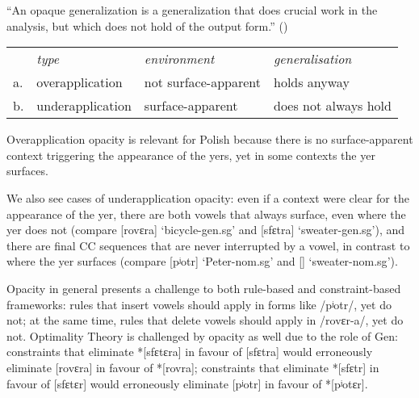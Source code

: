 \begin{example} \ee
\label{opacity}

``An opaque generalization is a generalization that does crucial work in the analysis, but which does not hold of the output form.''  (\citealt[338]{Idsardi:2000})

\begin{tabular}{llll}
	&{\it type}		&{\it environment}	&{\it generalisation}\\
a.	&overapplication&not surface-apparent	&holds anyway\\
b.	&underapplication&surface-apparent	&does not always hold\\ 
\end{tabular}
\end{example}


Overapplication opacity is relevant for Polish because there is no surface-ap\-par\-ent context triggering the appearance of the  yers, yet in some contexts the yer surfaces.

We also see cases of underapplication opacity: even if a context were clear for the appearance of the yer, there are both vowels that always surface, even where the yer does not (compare  [rovɛra] `bicycle-{\sc gen.sg}' and [sfɛtra] `sweater-{\sc gen.sg}'), and there are final CC sequences that are never interrupted by a vowel, in contrast to where the yer surfaces (compare [pʲotr] `Peter-{\sc nom.sg}' and  [] `sweater-{\sc nom.sg}').

Opacity in general presents a challenge to both rule-based and constraint-based frameworks: rules that insert vowels should apply in forms like /pʲotr/, yet do not; at the same time, rules that delete vowels should apply in /rovɛr-a/, yet do not. Optimality Theory is challenged by opacity as well due to the role of Gen: constraints that eliminate *[sfɛtɛra] in favour of [sfɛtra] would erroneously eliminate [rovɛra] in favour of  *[rovra]; constraints that eliminate *[sfɛtr] in favour of [sfɛtɛr] would erroneously eliminate [pʲotr] in favour of *[pʲotɛr].

